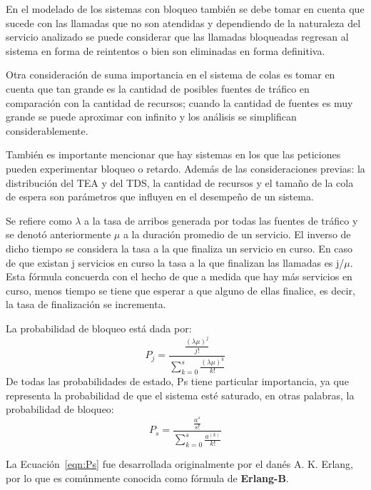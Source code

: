  En el modelado de los sistemas con bloqueo también se debe tomar en cuenta que sucede con las llamadas que no son atendidas y dependiendo de la naturaleza del servicio analizado se puede considerar que las llamadas bloqueadas regresan al sistema en forma de reintentos o bien son eliminadas en forma definitiva.\newline

 Otra consideración de suma importancia en el sistema de colas es tomar en cuenta que tan grande es la cantidad de posibles fuentes de tráfico en comparación con la cantidad de recursos; cuando la cantidad de fuentes es muy grande se puede aproximar con infinito y los análisis se simplifican considerablemente.\newline

 También es importante mencionar que hay sistemas en los que las peticiones pueden experimentar bloqueo o retardo. Además de las consideraciones previas: la distribución del TEA y del TDS, la cantidad de recursos y el tamaño de la cola de espera son parámetros que influyen en el desempeño de un sistema.\newline

 Se refiere como $\lambda$ a la tasa de arribos generada por todas las fuentes de tráfico y se denotó anteriormente $\mu$ a la duración promedio de un servicio. El inverso de dicho tiempo se considera la tasa a la que finaliza un servicio en curso. En caso de que existan j servicios en curso la tasa a la que finalizan las llamadas es j/$\mu$. Esta fórmula concuerda con el hecho de que a medida que hay más servicios en curso, menos tiempo se tiene que esperar a que alguno de ellas finalice, es decir, la tasa de finalización se incrementa.\newline

 La probabilidad de bloqueo está dada por:
\begin{equation}
    P_{j}=\frac{\frac{(\lambda\mu)^{j}}{j!}}{\sum_{k=0}^{s}\frac{(\lambda\mu)^{k}}{k!}}
    \label{eqn:Pb}
\end{equation} 
De todas las probabilidades de estado, Ps tiene particular importancia, ya que representa la probabilidad de que el sistema esté saturado, en otras palabras, la probabilidad de bloqueo:
\begin{equation}
    P_{s}=\frac{\frac{a^{s}}{s!}}{\sum_{k=0}^{s}\frac{a^(k)}{k!}}
    \label{eqn:Ps}
\end{equation} 

La Ecuación~\ref{eqn:Ps} fue desarrollada originalmente por el danés A. K. Erlang, por lo que es comúnmente conocida como fórmula de \textbf{Erlang-B}.\newline

